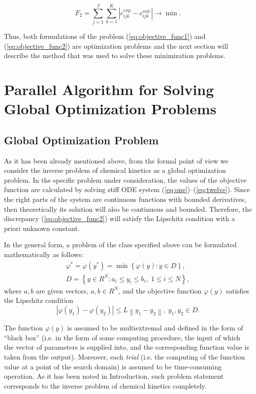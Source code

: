\documentclass{svproc}
\begin{document}
\begin{equation}
  F_2 = \sum_{j=1}^J \sum_{k=1}^K \left| c_{ijk}^{exp} - c_{ijk}^{calc} \right| \longrightarrow \min.
  \label{eq:objective_func2} 
\end{equation}

Thus, both formulations of the problem (\ref{eq:objective_func1}) and (\ref{eq:objective_func2}) are optimization problems and the next section will describe the method that was used to solve these minimization problems.

\section{Parallel Algorithm for Solving Global Optimization Problems }\label{Sec_GSA}

\subsection{Global Optimization Problem}

\textcolor[rgb]{1,0,0}{As it has been already mentioned above, from the formal point of view we consider the inverse problem of chemical kinetics as a global optimization problem. 
In the specific problem under consideration, the values of the objective function are calculated by solving stiff ODE system (\ref{eq:one})--(\ref{eq:twelve}). Since the right parts of the system are continuous functions with bounded derivatives, then theoretically its solution will also be continuous and bounded. Therefore, the discrepancy (\ref{eq:objective_func2}) will satisfy the Lipschitz condition with a priori unknown constant.}

In the general form, a problem of the class specified above can be formulated mathematically as 
follows:
\begin{gather}
 \varphi^* = \varphi(y^\ast)=\min{\left\{\varphi(y):y\in D\right\}}, \label{problemN}\\
 D=\left\{y\in R^N: a_i\leq y_i \leq b_i, \;  1\leq i \leq N\right\} \label{D},
\end{gather}
where $a,b$ are given vectors, $a,b\in R^N$, and the objective function $\varphi(y)$ satisfies the Lipschitz condition
\begin{equation}\label{Lip}
\left|\varphi(y_1)-\varphi(y_2)\right|\leq L\left\|y_1-y_2\right\|,\; y_1,y_2 \in D.
\end{equation}

The function $\varphi(y)$ is assumed to be multiextremal and defined in the form of ``black box'' (i.e. in the form of some computing procedure, the input of which the  vector of parameters is supplied into, and the corresponding function value is taken from the output). Moreover, each \textit{trial} (i.e. the computing of the function value at a point of the search domain) is assumed to be time-consuming operation. 
As it has been noted in Introduction, such problem statement corresponds to the inverse problem of chemical kinetics completely.
\end{document}
